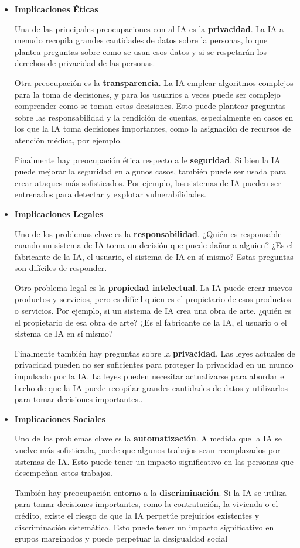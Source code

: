\begin{itemize}
	\item \textbf{Implicaciones Éticas}
	
	Una de las principales preocupaciones con al IA es la \textbf{privacidad}. La IA a menudo recopila grandes cantidades de datos sobre la personas, lo que plantea preguntas sobre como se usan esos datos y si se respetarán los derechos de privacidad de las personas.

	Otra preocupación es la \textbf{transparencia}. La IA emplear algoritmos complejos para la toma de decisiones, y para los usuarios a veces puede ser complejo comprender como se toman estas decisiones. Esto puede plantear preguntas sobre las responsabilidad y la rendición de cuentas, especialmente en casos en los que la IA toma decisiones importantes, como la asignación de recursos de atención médica, por ejemplo. 

	Finalmente hay preocupación ética respecto a le \textbf{seguridad}. Si bien la IA puede mejorar la seguridad en algunos casos, también puede ser usada para crear ataques más sofisticados. Por ejemplo, los sistemas de IA pueden ser entrenados para detectar y explotar vulnerabilidades.	
	
	\item \textbf{Implicaciones Legales}
	
	Uno de los problemas clave es la \textbf{responsabilidad}. ¿Quién es responsable cuando un sistema de IA toma un decisión que puede dañar a alguien? ¿Es el fabricante de la IA, el usuario, el sistema de IA en sí mismo? Estas preguntas son difíciles de responder. 

	Otro problema legal es la \textbf{propiedad intelectual}. La IA puede crear nuevos productos y servicios, pero es difícil quien es el propietario de esos productos o servicios. Por ejemplo, si un sistema de IA crea una obra de arte. ¿quién es el propietario de esa obra de arte? ¿Es el fabricante de la IA, el usuario o el sistema de IA en sí mismo?

	Finalmente también hay preguntas sobre la \textbf{privacidad}. Las leyes actuales de privacidad pueden no ser suficientes para proteger la privacidad en un mundo impulsado por la IA. La leyes pueden necesitar actualizarse para abordar el hecho de que la IA puede recopilar grandes cantidades de datos y utilizarlos para tomar decisiones importantes..

	\item \textbf{Implicaciones Sociales}
	
	Uno de los problemas clave es la \textbf{automatización}. A medida que la IA se vuelve más sofisticada, puede que algunos trabajos sean reemplazados por sistemas de IA. Esto puede tener un impacto significativo en las personas que desempeñan estos trabajos.

	También hay preocupación entorno a la \textbf{discriminación}. Si la IA se utiliza para tomar decisiones importantes, como la contratación, la vivienda o el crédito, existe el riesgo de que la IA perpetúe prejuicios existentes y discriminación sistemática. Esto puede tener un impacto significativo en grupos marginados y puede perpetuar la desigualdad social
\end{itemize}

